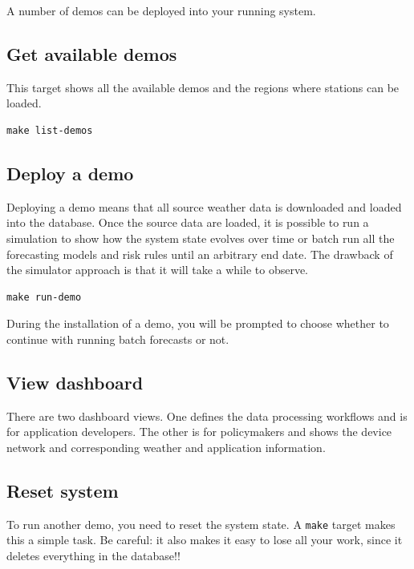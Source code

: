 \documentclass[
]{book}
\begin{document}
A number of demos can be deployed into your running system.

\hypertarget{get-available-demos}{%
\subsection{Get available demos}\label{get-available-demos}}

This target shows all the available demos and the regions where stations
can be loaded.

\begin{verbatim}
make list-demos
\end{verbatim}

\hypertarget{deploy-a-demo}{%
\subsection{Deploy a demo}\label{deploy-a-demo}}

Deploying a demo means that all source weather data is downloaded and loaded
into the database.
Once the source data are loaded, it is possible to run a simulation to show
how the system state evolves over time or batch run all the forecasting models
and risk rules until an arbitrary end date.
The drawback of the simulator approach is that it will take a while to
observe.

\begin{verbatim}
make run-demo
\end{verbatim}

During the installation of a demo, you will be prompted to choose whether
to continue with running batch forecasts or not.

\hypertarget{view-dashboard}{%
\subsection{View dashboard}\label{view-dashboard}}

There are two dashboard views. One defines the data processing workflows
and is for application developers. The other is for policymakers and shows
the device network and corresponding weather and application information.

\hypertarget{reset-system}{%
\subsection{Reset system}\label{reset-system}}

To run another demo, you need to reset the system state. A \texttt{make} target
makes this a simple task. Be careful: it also makes it easy to lose all your
work, since it deletes everything in the database!!
\end{document}
